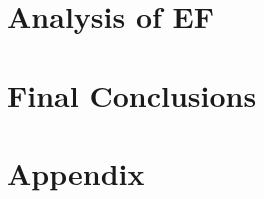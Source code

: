 \documentclass[oneside,openright,titlepage,numbers=noenddot,headinclude,%
                footinclude=true,cleardoublepage=empty,abstractoff, %
                BCOR=5mm,paper=a4,fontsize=11pt,%
                ngerman,american,british,%
                ]{scrreprt}
\begin{document}
\part{Analysis of EF}\label{pt:FA}

\part{Final Conclusions}\label{pt:CO}


\appendix
\cleardoublepage
\part{Appendix}


\cleardoublepage
\cleardoublepage
\end{document}
